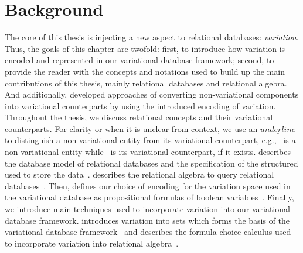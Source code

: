 \chapter{Background}
\label{ch:bg}

The core of this thesis is injecting a new aspect to relational databases: \emph{variation}.
Thus, the goals of this chapter are twofold: 
%
first, to introduce how variation is encoded and represented in our variational database framework;
%
second, to provide the reader with the concepts and notations
used to build up the main contributions of this thesis, mainly relational databases and
relational algebra.
%
And additionally, developed approaches of converting non-variational components into
variational counterparts by using the introduced encoding of variation. 
%
Throughout the thesis, we discuss relational concepts and their
variational counterparts. 
For clarity or when it is unclear from context, we use
an $\underline{underline}$ to distinguish a non-variational entity
from its variational counterpart,
e.g., \pElem\ is a 
non-variational entity while \elem\ is its variational counterpart,
if it exists.
%
 describes the database model of relational databases and the specification of
the structured used to store the data~\cite{AliceBook}. 
 describes the relational algebra to query relational databases~\cite{AliceBook}.
%
Then, 
 defines our choice of encoding for the variation space used in the 
variational database as propositional formulas of boolean variables~\cite{ATW18poly,ATW17dbpl}.
%
Finally, we introduce main techniques used to incorporate variation into our variational 
database framework.
 introduces variation into sets which forms the basis of the variational database
framework~\cite{EWC13fosd,Walk14onward,ATW17dbpl} 
and  describes the formula choice calculus used to incorporate 
variation into relational algebra~\cite{HW16fosd}.



%




